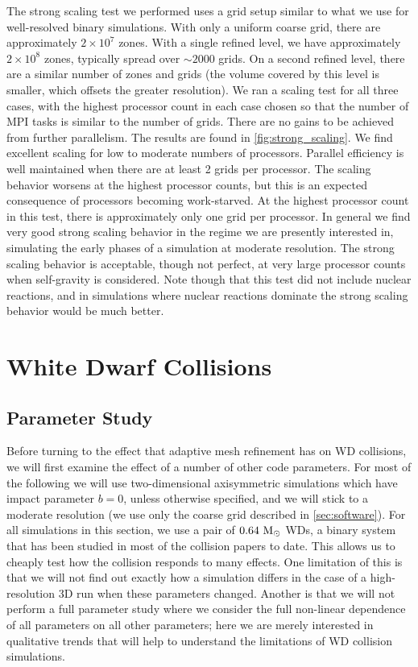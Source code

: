 \documentclass[12pt]{article}
\begin{document}
The strong scaling test we performed uses a grid setup similar to what we
use for well-resolved binary simulations. With only a uniform coarse grid,
there are approximately $2 \times 10^7$ zones. With a single refined level,
we have approximately $2 \times 10^8$ zones, typically spread over $\sim 2000$ grids.
On a second refined level, there are a similar number of zones and grids
(the volume covered by this level is smaller, which offsets the greater resolution).
We ran a scaling test for all three cases, with the
highest processor count in each case chosen so that the number of
MPI tasks is similar to the number of grids. There are no gains
to be achieved from further parallelism. The results are found in
\autoref{fig:strong_scaling}. We find excellent scaling for low to moderate numbers
of processors. Parallel efficiency is well maintained when there are
at least 2 grids per processor. The
scaling behavior worsens at the highest processor counts, but this is
an expected consequence of processors becoming work-starved. At the highest
processor count in this test, there is approximately only one grid per processor. In general
we find very good strong scaling behavior in the regime we are presently
interested in, simulating the early phases of a simulation at moderate
resolution. The strong scaling behavior is acceptable, though not perfect,
at very large processor counts when self-gravity is considered. Note though that this
test did not include nuclear reactions, and in simulations where nuclear reactions dominate
the strong scaling behavior would be much better.



\clearpage
\section{White Dwarf Collisions}
\label{sec:collisions}

\subsection{Parameter Study}
\label{sec:collision_parameters}

Before turning to the effect that adaptive mesh refinement has on WD collisions,
we will first examine the effect of a number of other code parameters. For most
of the following we will use two-dimensional axisymmetric simulations which have
impact parameter $b = 0$, unless otherwise specified, and we will stick to a
moderate resolution (we use only the coarse grid described in \autoref{sec:software}).
For all simulations in this section, we use a pair of $0.64\ \msolar$ WDs, a binary
system that has been studied in most of the collision papers to date. This allows
us to cheaply test how the collision responds to many effects. One limitation of
this is that we will not find out exactly how a simulation differs in the case of a
high-resolution 3D run when these parameters changed. Another is that we will not
perform a full parameter study where we consider the full non-linear dependence of
all parameters on all other parameters; here we are merely interested in qualitative
trends that will help to understand the limitations of WD collision simulations.
\end{document}
